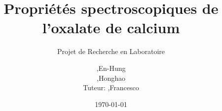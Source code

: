 \title{Propriétés spectroscopiques de l'oxalate de calcium}
\subtitle{Projet de Recherche en Laboratoire}
\author{\begin{tabularx}{\textwidth}{RL}
    ,& En-Hung\\
    ,& Honghao\\
    Tuteur: ,& Francesco
  \end{tabularx}
}
\date{\today}

